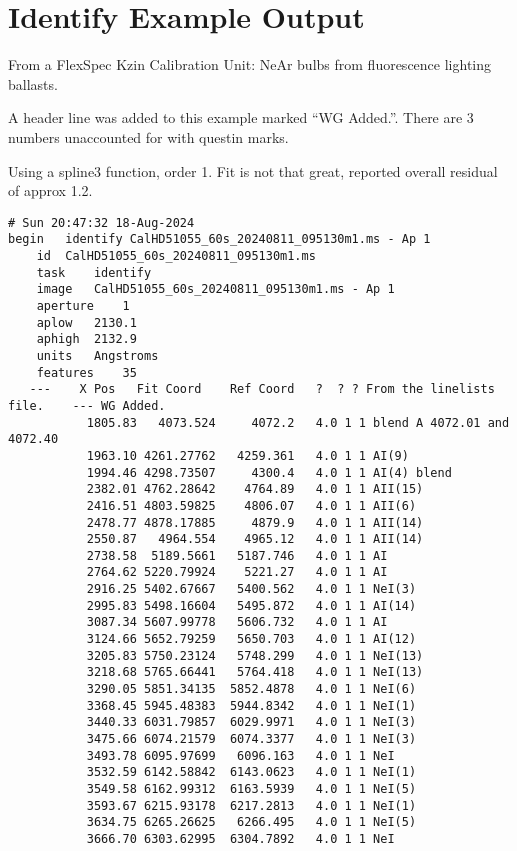 \section{Identify Example Output}

From a FlexSpec Kzin Calibration Unit: NeAr bulbs from fluorescence
lighting ballasts.

A header line was added to this example marked ``WG Added.''. There
are 3 numbers unaccounted for with questin marks.

Using a spline3 function, order 1. Fit is not that great, reported overall
residual of approx 1.2.

\begingroup \fontsize{10pt}{10pt}
\selectfont
\begin{verbatim} 
# Sun 20:47:32 18-Aug-2024
begin	identify CalHD51055_60s_20240811_095130m1.ms - Ap 1
	id	CalHD51055_60s_20240811_095130m1.ms
	task	identify
	image	CalHD51055_60s_20240811_095130m1.ms - Ap 1
	aperture	1
	aplow	2130.1
	aphigh	2132.9
	units	Angstroms
	features	35
   ---    X Pos   Fit Coord    Ref Coord   ?  ? ? From the linelists file.    --- WG Added.
	       1805.83   4073.524     4072.2   4.0 1 1 blend A 4072.01 and 4072.40
	       1963.10 4261.27762   4259.361   4.0 1 1 AI(9)
	       1994.46 4298.73507     4300.4   4.0 1 1 AI(4) blend
	       2382.01 4762.28642    4764.89   4.0 1 1 AII(15)
	       2416.51 4803.59825    4806.07   4.0 1 1 AII(6)
	       2478.77 4878.17885     4879.9   4.0 1 1 AII(14)
	       2550.87   4964.554    4965.12   4.0 1 1 AII(14)
	       2738.58  5189.5661   5187.746   4.0 1 1 AI
	       2764.62 5220.79924    5221.27   4.0 1 1 AI
	       2916.25 5402.67667   5400.562   4.0 1 1 NeI(3)
	       2995.83 5498.16604   5495.872   4.0 1 1 AI(14)
	       3087.34 5607.99778   5606.732   4.0 1 1 AI
	       3124.66 5652.79259   5650.703   4.0 1 1 AI(12)
	       3205.83 5750.23124   5748.299   4.0 1 1 NeI(13)
	       3218.68 5765.66441   5764.418   4.0 1 1 NeI(13)
	       3290.05 5851.34135  5852.4878   4.0 1 1 NeI(6)
	       3368.45 5945.48383  5944.8342   4.0 1 1 NeI(1)
	       3440.33 6031.79857  6029.9971   4.0 1 1 NeI(3)
	       3475.66 6074.21579  6074.3377   4.0 1 1 NeI(3)
	       3493.78 6095.97699   6096.163   4.0 1 1 NeI
	       3532.59 6142.58842  6143.0623   4.0 1 1 NeI(1)
	       3549.58 6162.99312  6163.5939   4.0 1 1 NeI(5)
	       3593.67 6215.93178  6217.2813   4.0 1 1 NeI(1)
	       3634.75 6265.26625   6266.495   4.0 1 1 NeI(5)
	       3666.70 6303.62995  6304.7892   4.0 1 1 NeI

\end{verbatim}
